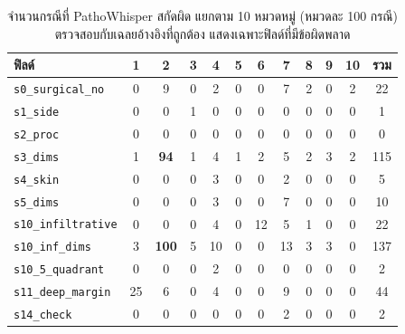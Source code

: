 \begin{table}[H]
\centering
\caption{จำนวนกรณีที่ PathoWhisper สกัดผิด แยกตาม 10 หมวดหมู่ (หมวดละ 100 กรณี) ตรวจสอบกับเฉลยอ้างอิงที่ถูกต้อง แสดงเฉพาะฟิลด์ที่มีข้อผิดพลาด}
\label{tab:caterr}
\footnotesize\setlength{\tabcolsep}{2.5pt}
\begin{tabular}{|p{3.6cm}|c|c|c|c|c|c|c|c|c|c|c|}
\hline
\textbf{ฟิลด์} & \textbf{1} & \textbf{2} & \textbf{3} & \textbf{4} & \textbf{5} & \textbf{6} & \textbf{7} & \textbf{8} & \textbf{9} & \textbf{10} & \textbf{รวม} \\
\hline
\texttt{s0\_surgical\_no} & 0 & 9 & 0 & 2 & 0 & 0 & 7 & 2 & 0 & 2 & 22 \\
\hline
\texttt{s1\_side} & 0 & 0 & 1 & 0 & 0 & 0 & 0 & 0 & 0 & 0 & 1 \\
\hline
\texttt{s2\_proc} & 0 & 0 & 0 & 0 & 0 & 0 & 0 & 0 & 0 & 0 & 0 \\
\hline
\texttt{s3\_dims} & 1 & \textbf{94} & 1 & 4 & 1 & 2 & 5 & 2 & 3 & 2 & 115 \\
\hline
\texttt{s4\_skin} & 0 & 0 & 0 & 3 & 0 & 0 & 2 & 0 & 0 & 0 & 5 \\
\hline
\texttt{s5\_dims} & 0 & 0 & 0 & 3 & 0 & 0 & 7 & 0 & 0 & 0 & 10 \\
\hline
\texttt{s10\_infiltrative} & 0 & 0 & 0 & 4 & 0 & 12 & 5 & 1 & 0 & 0 & 22 \\
\hline
\texttt{s10\_inf\_dims} & 3 & \textbf{100} & 5 & 10 & 0 & 0 & 13 & 3 & 3 & 0 & 137 \\
\hline
\texttt{s10\_5\_quadrant} & 0 & 0 & 0 & 2 & 0 & 0 & 0 & 0 & 0 & 0 & 2 \\
\hline
\texttt{s11\_deep\_margin} & 25 & 6 & 0 & 4 & 0 & 0 & 9 & 0 & 0 & 0 & 44 \\
\hline
\texttt{s14\_check} & 0 & 0 & 0 & 0 & 0 & 0 & 2 & 0 & 0 & 0 & 2 \\
\hline
\end{tabular}
\end{table}
